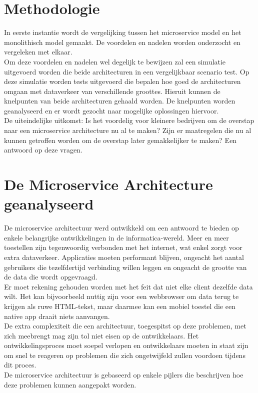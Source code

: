 \documentclass[pdftex,a4paper,12pt,twoside]{report}
\begin{document}
\chapter{Methodologie}
\label{ch:methodologie}

In eerste instantie wordt de vergelijking tussen het microservice model en het monolithisch model gemaakt. De voordelen en nadelen worden onderzocht en vergeleken met elkaar.
\\
Om deze voordelen en nadelen wel degelijk te bewijzen zal een simulatie uitgevoerd worden die beide architecturen in een vergelijkbaar scenario test. Op deze simulatie worden tests uitgevoerd die bepalen hoe goed de architecturen omgaan met dataverkeer van verschillende groottes. Hieruit kunnen de knelpunten van beide architecturen gehaald worden.
De knelpunten worden geanalyseerd en er wordt gezocht naar mogelijke oplossingen hiervoor.
\\
De uiteindelijke uitkomst: Is het voordelig voor kleinere bedrijven om de overstap naar een microservice architecture nu al te maken? Zijn er maatregelen die nu al kunnen getroffen worden om de overstap later gemakkelijker te maken? Een antwoord op deze vragen.

\chapter{De Microservice Architecture geanalyseerd}
\label{ch:analyse}

De microservice architectuur werd ontwikkeld om een antwoord te bieden op enkele belangrijke ontwikkelingen in de informatica-wereld. Meer en meer toestellen zijn tegenwoordig verbonden met het internet, wat enkel zorgt voor extra dataverkeer. Applicaties moeten performant blijven, ongeacht het aantal gebruikers die tezelfdertijd verbinding willen leggen en ongeacht de grootte van de data die wordt opgevraagd.
\\
Er moet rekening gehouden worden met het feit dat niet elke client dezelfde data wilt. Het kan bijvoorbeeld nuttig zijn voor een webbrowser om data terug te krijgen als ruwe HTML-tekst, maar daarmee kan een mobiel toestel die een native app draait niets aanvangen.
\\
De extra complexiteit die een architectuur, toegespitst op deze problemen, met zich meebrengt mag zijn tol niet eisen op de ontwikkelaars. Het ontwikkelingsproces moet soepel verlopen en ontwikkelaars moeten in staat zijn om snel te reageren op problemen die zich ongetwijfeld zullen voordoen tijdens dit proces.
\\
De microservice architectuur is gebaseerd op enkele pijlers die beschrijven hoe deze problemen kunnen aangepakt worden.
\end{document}
